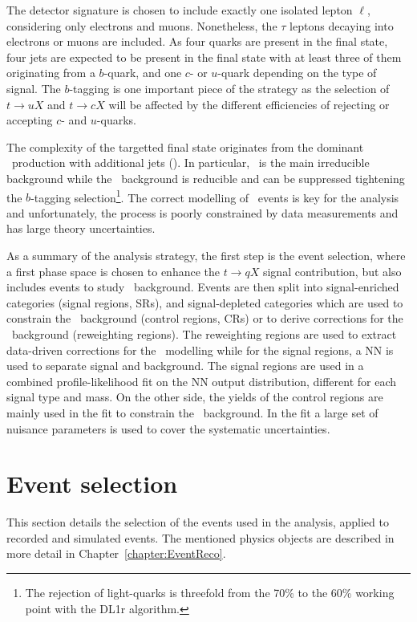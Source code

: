 The detector signature is chosen to include exactly one isolated lepton $\ell$, considering only electrons and muons. Nonetheless, the $\tau$ leptons decaying into electrons or muons are included. As four quarks are present in the final state, four jets are expected to be present in the final state with at least three of them originating from a $b$-quark, and one $c$- or $u$-quark depending on the type of signal. The $b$-tagging is one important piece of the strategy as the selection of $t\to uX$ and $t\to cX$ will be affected by the different efficiencies of rejecting or accepting $c$- and $u$-quarks.

The  complexity of the targetted final state originates from the dominant \ttbar\ production with additional jets (\ttjets). In particular, \ttb\ is the main irreducible background while the \ttl\ background is reducible and can be suppressed tightening the $b$-tagging selection\footnote{The rejection of light-quarks is threefold from the 70\% to the 60\% working point with the DL1r algorithm.}. The correct modelling of \ttbar\ events is key for the analysis and unfortunately, the process is poorly constrained by data measurements and has large theory uncertainties.

As a summary of the analysis strategy, the first step is the event selection, where a first phase space is chosen to enhance the $t\to qX$ signal contribution, but also includes events to study \ttjets\ background. Events are then split into signal-enriched categories (signal regions, SRs), and signal-depleted categories which are used to constrain the \ttb\ background (control regions, CRs) or to derive corrections for the \ttjets\ background (reweighting regions). The reweighting regions are used to extract data-driven corrections for the \ttbar\ modelling while for the signal regions, a NN is used to separate signal and background. The signal regions are used in a combined profile-likelihood fit on the NN output distribution, different for each signal type and mass. On the other side, the yields of the control regions are mainly used in the fit to constrain the \ttb\ background. In the fit a large set of nuisance parameters is used to cover the systematic uncertainties.

\section{Event selection}
\label{tqX:SectionEventSelection}
This section details the selection of the events used in the analysis, applied to recorded and simulated events. The mentioned physics objects are described in more detail in Chapter~\ref{chapter:EventReco}.

